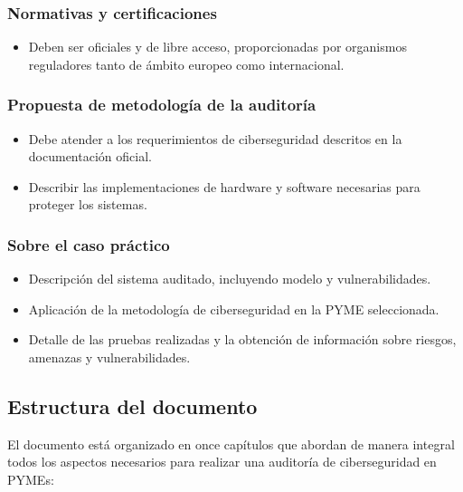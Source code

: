 \documentclass[a4paper, 10pt]{article}
\begin{document}
\subsubsection{Normativas y certificaciones}
\begin{itemize}
    \item Deben ser oficiales y de libre acceso, proporcionadas por organismos reguladores tanto de ámbito europeo como internacional.
\end{itemize}

\subsubsection{Propuesta de metodología de la auditoría}
\begin{itemize}
    \item Debe atender a los requerimientos de ciberseguridad descritos en la documentación oficial.
    \item Describir las implementaciones de hardware y software necesarias para proteger los sistemas.
\end{itemize}

\subsubsection{Sobre el caso práctico}
\begin{itemize}
    \item Descripción del sistema auditado, incluyendo modelo y vulnerabilidades.
    \item Aplicación de la metodología de ciberseguridad en la PYME seleccionada.
    \item Detalle de las pruebas realizadas y la obtención de información sobre riesgos, amenazas y vulnerabilidades.
\end{itemize}


\subsection{Estructura del documento}

El documento está organizado en once capítulos que abordan de manera integral todos los aspectos necesarios para realizar una auditoría de ciberseguridad en PYMEs:
\end{document}
